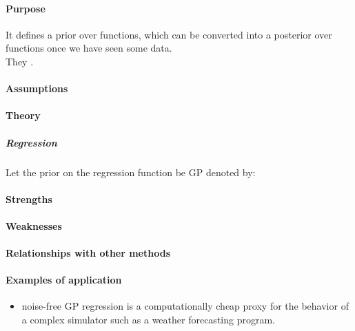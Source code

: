 \paragraph{Purpose}
It defines a prior over functions, which can be converted into a posterior over 
functions once we have seen some data.\\
They .
\paragraph{Assumptions}
\paragraph{Theory}
\subparagraph{Regression}
Let the prior on the regression function be GP denoted by:
\begin{center}
\end{center}

\paragraph{Strengths}
\paragraph{Weaknesses}
\paragraph{Relationships with other methods}
\paragraph{Examples of application}
\begin{itemize}
    \item noise-free GP regression is a computationally cheap proxy for the behavior
        of a complex simulator such as a weather forecasting program.
\end{itemize}




